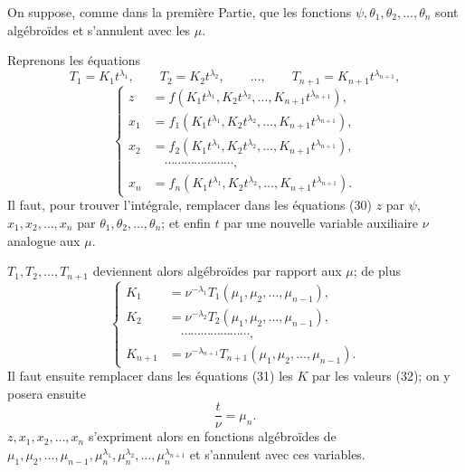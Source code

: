 \documentclass[11pt]{article}
\begin{document}
On suppose, comme dans la première Partie, que les fonctions $\psi,\theta_1,\theta_2,\ldots,\theta_n$ sont algébroïdes et s’annulent avec les $\mu$.

Reprenons les équations
\begin{equation*}\tag{30}
T_1=K_1t^{\lambda_1},
\qquad
T_2=K_2t^{\lambda_2},
\qquad \ldots,
\qquad
T_{n+1}=K_{n+1}t^{\lambda_{n+1}},
\end{equation*}
\begin{equation*}\tag{31}
\left\{
\begin{aligned}
z&=f(K_1t^{\lambda_1},K_2t^{\lambda_2},\ldots,K_{n+1}t^{\lambda_{n+1}}),\\
x_1&=f_1(K_1t^{\lambda_1},K_2t^{\lambda_2},\ldots,K_{n+1}t^{\lambda_{n+1}}),\\
x_2&=f_2(K_1t^{\lambda_1},K_2t^{\lambda_2},\ldots,K_{n+1}t^{\lambda_{n+1}}),\\
&\hspace{1em}\cdots\cdots\cdots\cdots\cdots\cdots\cdots,\\
x_n&=f_n(K_1t^{\lambda_1},K_2t^{\lambda_2},\ldots,K_{n+1}t^{\lambda_{n+1}}).
\end{aligned}
\right.
\end{equation*}
Il faut, pour trouver l’intégrale, remplacer dans les équations (30) $z$ par $\psi$, $x_1,x_2,\ldots,x_n$ par $\theta_1,\theta_2,\ldots,\theta_n$; et enfin $t$ par une nouvelle variable auxiliaire $\nu$ analogue aux $\mu$.

$T_1,T_2,\ldots,T_{n+1}$ deviennent alors algébroïdes par rapport aux $\mu$; de plus
\begin{equation*}\tag{32}
\left\{
\begin{aligned}
K_1&=\nu^{-\lambda_1}T_1(\mu_1,\mu_2,\ldots,\mu_{n-1}),\\
K_2&=\nu^{-\lambda_2}T_2(\mu_1,\mu_2,\ldots,\mu_{n-1}),\\
&\hspace{1em}\cdots\cdots\cdots\cdots\cdots\cdots\cdots,\\
K_{n+1}&=\nu^{-\lambda_{n+1}}T_{n+1}(\mu_1,\mu_2,\ldots,\mu_{n-1}).
\end{aligned}
\right.
\end{equation*}
Il faut ensuite remplacer dans les équations (31) les $K$ par les valeurs (32); on y posera ensuite
\[
\frac{t}{\nu}=\mu_n.
\]
$z,x_1,x_2,\ldots,x_n$ s’expriment alors en fonctions algébroïdes de $\mu_1,\mu_2,\ldots,\mu_{n-1},\mu_n^{\lambda_1},\mu_n^{\lambda_2},\ldots,\mu_n^{\lambda_{n+1}}$ et s’annulent avec ces variables.
\end{document}
